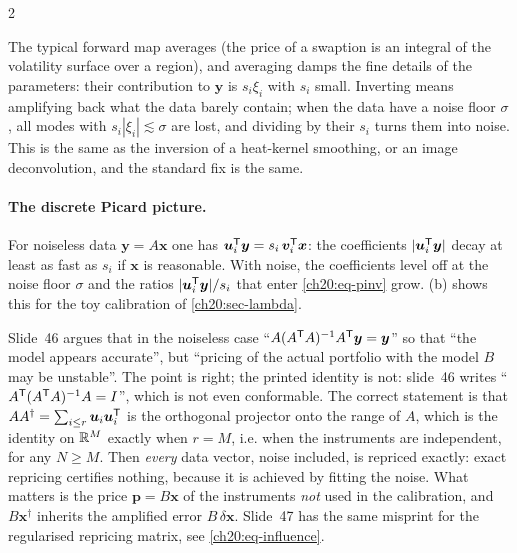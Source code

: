 \begin{paracol}{2}
\begin{intuition}
The typical forward map averages (the price of a swaption is an integral of the volatility surface over a region), and averaging damps the fine details of the parameters: their contribution to $\bm y$ is $s_i\xi_i$ with $s_i$ small. Inverting means amplifying
back what the data barely contain; when the data have a noise floor $\sigma$, all modes with $s_i|\xi_i|\lesssim\sigma$ are lost, and dividing by their $s_i$ turns them into noise.
This is the same as the inversion of a heat-kernel smoothing, or an image deconvolution, and the standard fix is the same.
\end{intuition}

\paragraph{The discrete Picard picture.} For noiseless data $\bm y=A\bm x$ one has $\bm u_i^{\mathsf T}\bm y=s_i\,\bm v_i^{\mathsf T}\bm x$: the coefficients $|\bm u_i^{\mathsf T}\bm y|$ decay at least as fast as $s_i$ if $\bm x$ is reasonable. With noise, the coefficients level off at the noise floor
$\sigma$ and the ratios $|\bm u_i^{\mathsf T}\bm y|/s_i$ that enter \eqref{ch20:eq-pinv} grow. (b) shows this for the toy calibration of \cref{ch20:sec-lambda}.

\begin{coursenote}\label{ch20:cn-noiseless}
Slide~46 argues that in the noiseless case ``$A(A^{\mathsf T} A)^{-1}A^{\mathsf T}\bm y=\bm y$'' so that ``the model appears accurate'', but ``pricing of the actual portfolio with the model $B$ may be unstable''. The point is right; the printed identity is not: slide~46
writes ``$A^{\mathsf T}(A^{\mathsf T} A)^{-1}A=I$'', which is not even conformable. The correct statement is that $AA^\dagger=\sum_{i\le r}\bm u_i\bm u_i^{\mathsf T}$ is the orthogonal projector onto the range of $A$, which is the identity on $\mathbb{R}^M$ exactly when $r=M$, i.e. when
the instruments are independent, for any $N\ge M$. Then \emph{every} data vector, noise included, is repriced exactly: exact repricing certifies nothing, because it is achieved by fitting the noise. What matters is the price $\bm p=B\bm x$ of the
instruments \emph{not} used in the calibration, and $B\bm x^\dagger$ inherits the amplified error $B\,\delta\bm x$. Slide~47 has the same misprint for the regularised repricing matrix, see \eqref{ch20:eq-influence}.
\end{coursenote}


\end{paracol}

